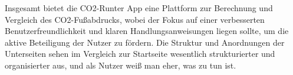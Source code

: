 Insgesamt bietet die CO2-Runter App eine Plattform zur Berechnung und Vergleich des CO2-Fußabdrucks, wobei der Fokus auf einer verbesserten Benutzerfreundlichkeit und klaren Handlungsanweisungen liegen sollte, um die aktive Beteiligung der Nutzer zu fördern.
Die Struktur und Anordnungen der Unterseiten sehen im Vergleich zur Startseite wesentlich strukturierter und organisierter aus, und als Nutzer weiß man eher, was zu tun ist.
